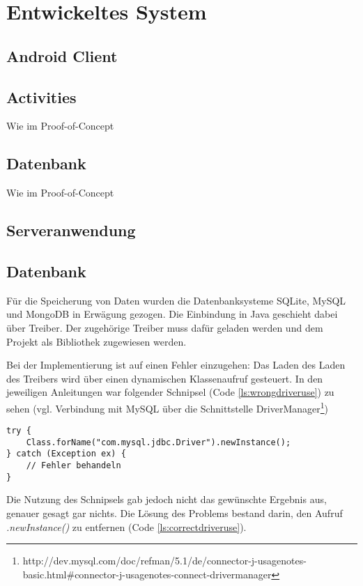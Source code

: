
\section{Entwickeltes System}


\subsection{Android Client}

\subsection{Activities}
Wie im Proof-of-Concept

\subsection{Datenbank}
Wie im Proof-of-Concept

\subsection{Serveranwendung}

\subsection{Datenbank}

Für die Speicherung von Daten wurden die Datenbanksysteme SQLite, MySQL und MongoDB in Erwägung gezogen. Die Einbindung in Java geschieht dabei über Treiber. Der zugehörige Treiber  muss dafür geladen werden und dem Projekt als Bibliothek zugewiesen werden.

Bei der Implementierung ist auf einen Fehler einzugehen: Das Laden des Laden des Treibers wird über einen dynamischen Klassenaufruf gesteuert. In den jeweiligen Anleitungen war folgender Schnipsel (Code \ref{ls:wrongdriveruse}) zu sehen (vgl. Verbindung mit MySQL über die Schnittstelle DriverManager\footnote{http://dev.mysql.com/doc/refman/5.1/de/connector-j-usagenotes-basic.html\#connector-j-usagenotes-connect-drivermanager})

\begin{lstlisting}[label=ls:wrongdriveruse,caption=Fehlerhafter dynamischer Klassenaufruf]
try {
	Class.forName("com.mysql.jdbc.Driver").newInstance();
} catch (Exception ex) {
	// Fehler behandeln
}
\end{lstlisting}

Die Nutzung des Schnipsels gab jedoch nicht das gewünschte Ergebnis aus, genauer gesagt gar nichts. Die Lösung des Problems bestand darin, den Aufruf \textit{.newInstance()} zu entfernen (Code \ref{ls:correctdriveruse}).

